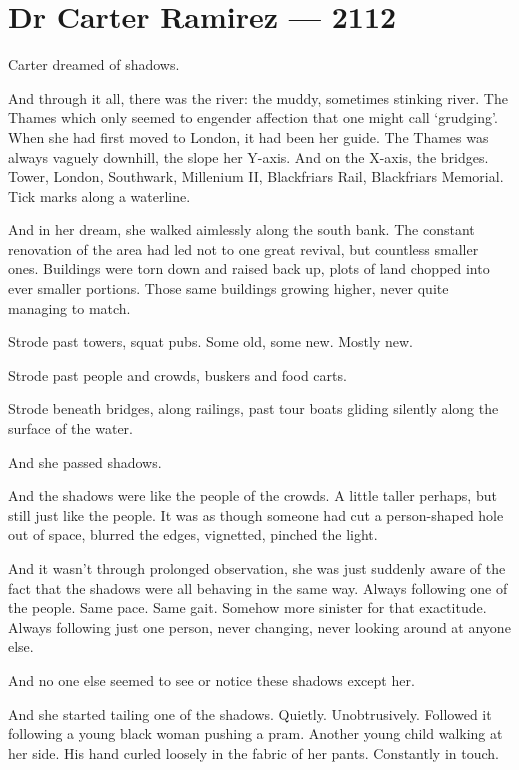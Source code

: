 \hypertarget{dr-carter-ramirez-2112}{%
\chapter*{Dr Carter Ramirez — 2112}\label{dr-carter-ramirez-2112}}

Carter dreamed of shadows.

And through it all, there was the river: the muddy, sometimes stinking river. The Thames which only seemed to engender affection that one might call `grudging'. When she had first moved to London, it had been her guide. The Thames was always vaguely downhill, the slope her Y-axis. And on the X-axis, the bridges. Tower, London, Southwark, Millenium II, Blackfriars Rail, Blackfriars Memorial. Tick marks along a waterline.

And in her dream, she walked aimlessly along the south bank. The constant renovation of the area had led not to one great revival, but countless smaller ones. Buildings were torn down and raised back up, plots of land chopped into ever smaller portions. Those same buildings growing higher, never quite managing to match.

Strode past towers, squat pubs. Some old, some new. Mostly new.

Strode past people and crowds, buskers and food carts.

Strode beneath bridges, along railings, past tour boats gliding silently along the surface of the water.

And she passed shadows.

And the shadows were like the people of the crowds. A little taller perhaps, but still just like the people. It was as though someone had cut a person-shaped hole out of space, blurred the edges, vignetted, pinched the light.

And it wasn't through prolonged observation, she was just suddenly aware of the fact that the shadows were all behaving in the same way. Always following one of the people. Same pace. Same gait. Somehow more sinister for that exactitude. Always following just one person, never changing, never looking around at anyone else.

And no one else seemed to see or notice these shadows except her.

And she started tailing one of the shadows. Quietly. Unobtrusively. Followed it following a young black woman pushing a pram. Another young child walking at her side. His hand curled loosely in the fabric of her pants. Constantly in touch.


